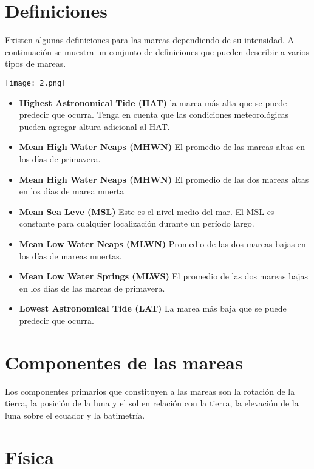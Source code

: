  
 \section{Definiciones}
\noindent Existen algunas definiciones para las mareas dependiendo de su intensidad. A continuación se muestra un conjunto de definiciones que pueden describir a varios tipos de mareas.
\vspace{0.5cm}
 
 \texttt{[image: 2.png]}
 
 \begin{itemize}
 

 \item {\textbf{Highest Astronomical Tide (HAT)}}
la marea más alta que se puede predecir que ocurra. Tenga en cuenta que las condiciones meteorológicas pueden agregar altura adicional al HAT.

\item{\textbf{Mean High Water Neaps (MHWN)}}
El promedio de las mareas altas en los días de primavera. 

\item{\textbf{Mean High Water Neaps (MHWN)}}
El promedio de las dos mareas altas en los días de marea muerta

\item{\textbf{Mean Sea Leve (MSL)}}
Este es el nivel medio del mar. El MSL es constante para cualquier localización durante un período largo.

\item{\textbf{Mean Low Water Neaps (MLWN)}}
Promedio de las dos mareas bajas en los días de mareas muertas.

\item{\textbf{Mean Low Water Springs (MLWS)}}
El promedio de las dos mareas bajas en los días de las mareas de primavera.

\item{\textbf{Lowest Astronomical Tide (LAT)}}
La marea más baja que se puede predecir que ocurra. 
 \end{itemize}
 
\section{Componentes de las mareas}
\noindent Los componentes primarios que constituyen a las mareas son la rotación de la tierra, la posición de la luna y el sol en relación con la tierra, la elevación de la luna sobre el ecuador y la batimetría. 

\section{Física}

